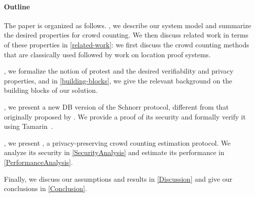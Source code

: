 \paragraph*{Outline}

The paper is organized as follows.
, we describe our system model and summarize the desired 
properties for crowd counting.
We then discuss related work in terms of these properties in 
\cref{related-work}:
we first discuss the crowd counting methods that are classically used followed 
by work on location proof systems.

, we formalize the notion of protest and the desired 
verifiability and privacy properties, and in \cref{building-blocks}, we give 
the relevant background on the building blocks of our solution.

, we present a new \ac{DB} version of the Schnorr protocol, 
different from that originally proposed by \textcite{DistanceBounding}.
We provide a proof of its security and formally verify it using 
Tamarin~\cite{TamarinDB}.

, we present \CROCUS, a privacy-preserving crowd counting 
estimation protocol.
We analyze its security in \cref{SecurityAnalysis} and estimate its performance 
in \cref{PerformanceAnalysis}.

Finally, we discuss our assumptions and results in \cref{Discussion} and give 
our conclusions in \cref{Conclusion}.
